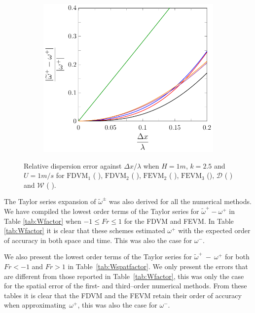 \begin{figure}
\begin{subfigure}{0.5\textwidth}
	\end{subfigure}
	\par\bigskip
	\begin{subfigure}{0.5\textwidth}
		\includegraphics[width=\textwidth]{./chp4/figures/New/Dispu1Fill.pdf}
	\end{subfigure}
	\caption{Relative dispersion error against $\Delta x / \lambda$ when $H = 1m$, $k = 2.5$ and $U = 1m/s$ for $\text{FDVM}_1$ ({\color{green!60!black} \solidrule}), $\text{FDVM}_2$ ({\color{red} \solidrule}), $\text{FEVM}_2$ ({\color{blue} \solidrule}), $\text{FEVM}_3$ ({\solidrule}), $\mathcal{D}$ ({\color{violet!80!white} \solidrule}) and $\mathcal{W}$ ({\color{orange} \solidrule}).}
	\label{fig:Dispu1Fill}
\end{figure}

The Taylor series expansion of $\widetilde{\omega}^\pm$ was also derived for all the numerical methods. We have compiled the lowest order terms of the Taylor series for $\widetilde{\omega}^+-\omega^+$ in Table \ref{tab:Wfactor} when $ -1 \le Fr \le 1$ for the FDVM and FEVM. In Table \ref{tab:Wfactor} it is clear that these schemes estimated $\omega^+$ with the expected order of accuracy in both space and time. This was also the case for $\omega^-$.

We also present the lowest order terms of the Taylor series for $\widetilde{\omega}^+~-~\omega^+$ for both $ Fr < -1$ and $ Fr > 1$ in Table~\ref{tab:Wspatfactor}. We only present the errors that are different from those reported in Table~\ref{tab:Wfactor}, this was only the case for the spatial error of the first- and third--order numerical methods. From these tables it is clear that the FDVM and the FEVM retain their order of accuracy when approximating~$\omega^+$, this was also the case for $\omega^-$. 

